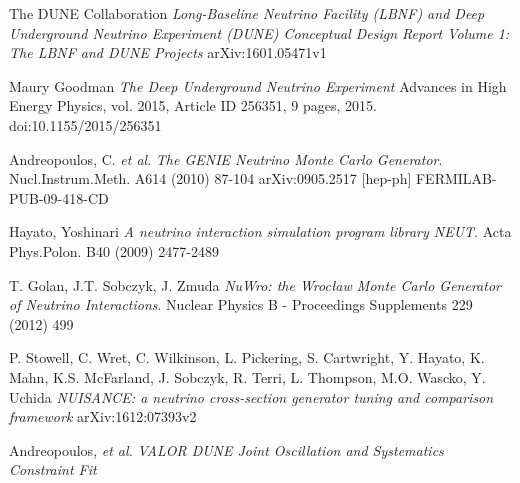 \documentclass[12pt]{article}
\begin{document}
\begin{thebibliography}{7}

The DUNE Collaboration
\textit{Long-Baseline Neutrino Facility (LBNF) and Deep Underground Neutrino Experiment (DUNE) Conceptual Design Report Volume 1: The LBNF and DUNE Projects}
arXiv:1601.05471v1

Maury Goodman
\textit{The Deep Underground Neutrino Experiment}
Advances in High Energy Physics, vol. 2015, Article ID 256351, 9 pages, 2015. doi:10.1155/2015/256351

Andreopoulos, C. \textit{et al}.
\textit{The GENIE Neutrino Monte Carlo Generator}.
Nucl.Instrum.Meth. A614 (2010) 87-104 arXiv:0905.2517 [hep-ph] FERMILAB-PUB-09-418-CD

Hayato, Yoshinari 
\textit{A neutrino interaction simulation program library NEUT}.
Acta Phys.Polon. B40 (2009) 2477-2489

T. Golan, J.T. Sobczyk, J. Zmuda
\textit{NuWro: the Wrocław Monte Carlo Generator of Neutrino Interactions}.
Nuclear Physics B - Proceedings Supplements 229 (2012) 499

P. Stowell, C. Wret, C. Wilkinson, L. Pickering, S. Cartwright, Y. Hayato, K. Mahn, K.S. McFarland, J. Sobczyk, R. Terri, L. Thompson, M.O. Wascko, Y. Uchida
\textit{NUISANCE: a neutrino cross-section generator tuning and comparison framework}
arXiv:1612:07393v2

Andreopoulos, \textit{et al.}
\textit{VALOR DUNE Joint Oscillation and Systematics Constraint Fit}


\end{thebibliography}
\end{document}
